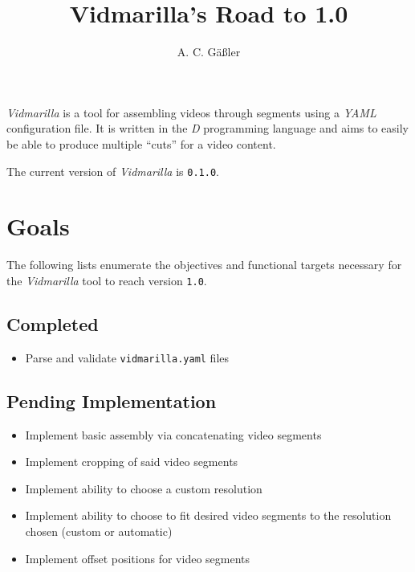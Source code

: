 \documentclass[12pt]{article}
\title{Vidmarilla's Road to 1.0}
\author{A. C. Gäßler}
\date{}
\begin{document}
\maketitle

\textit{Vidmarilla} is a tool for assembling videos through segments using a \textit{YAML} configuration file. It is written in the \textit{D} programming language and aims to easily be able to produce multiple ``cuts'' for a video content.

\bigskip

The current version of \textit{Vidmarilla} is \texttt{0.1.0}.

\section*{Goals}

The following lists enumerate the objectives and functional targets necessary for the \textit{Vidmarilla} tool to reach version \texttt{1.0}.

\subsection*{Completed}
\begin{itemize}[label=$\checkmark$]
	\item Parse and validate \texttt{vidmarilla.yaml} files
\end{itemize}

\subsection*{Pending Implementation}
\begin{itemize}[label=$\square$]
	\item Implement basic assembly via concatenating video segments
	\item Implement cropping of said video segments
	\item Implement ability to choose a custom resolution
	\item Implement ability to choose to fit desired video segments to the resolution chosen (custom or automatic)
	\item Implement offset positions for video segments
\end{itemize}
\end{document}
